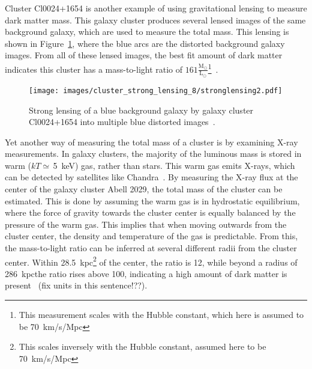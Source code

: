 Cluster \mbox{Cl0024+1654} is another example of using gravitational lensing to measure dark matter mass.
This galaxy cluster produces several lensed images of the same background galaxy, which are used to measure the total mass.
This lensing is shown in Figure~\ref{fig:stronglens}, where the blue arcs are the distorted background galaxy images.
From all of these lensed images, the best fit amount of dark matter indicates this cluster has a mass-to-light ratio of $161 \frac{\textrm{M}_{\odot}}{\textrm{L}_{\odot}}$\footnote[3]{This measurement scales with the Hubble constant, which here is assumed to be \SI{70}{km/s/Mpc}}~\cite{cluster_strong_lensing_1996, cluster_strong_lensing_1998, cluster_strong_lensing_2010}.
    
\begin{figure}[!ht]
  \centering
  \texttt{[image: images/cluster\_strong\_lensing\_8/stronglensing2.pdf]}
  \caption[Gravitational Lensing in Cl0024+1654]{
    Strong lensing of a blue background galaxy by galaxy cluster Cl0024+1654 into multiple blue distorted images~\cite{cluster_strong_lensing_1996}.
  }
  \label{fig:stronglens}
\end{figure}
    
Yet another way of measuring the total mass of a cluster is by examining X-ray measurements.
In galaxy clusters, the majority of the luminous mass is stored in warm ($kT\simeq\,$\SI{5}{keV}) gas, rather than stars.
This warm gas emits X-rays, which can be detected by satellites like Chandra~\cite{chandra}.
By measuring the X-ray flux at the center of the galaxy cluster Abell 2029, the total mass of the cluster can be estimated.
This is done by assuming the warm gas is in hydrostatic equilibrium, where the force of gravity towards the cluster center is equally balanced by the pressure of the warm gas.
This implies that when moving outwards from the cluster center, the density and temperature of the gas is predictable.
From this, the mass-to-light ratio can be inferred at several different radii from the cluster center.
Within \SI{28.5}{kpc}\footnote[2]{This scales inversely with the Hubble constant, assumed here to be \SI{70}{km/s/Mpc}} of the center, the ratio is \SI{12}{}, while beyond a radius of \SI{286}{kpc}\footnotemark[2] the ratio rises above \SI{100}{}, indicating a high amount of dark matter is present~\cite{cluster_chandra} {\color{red}(fix units in this sentence!??)}.

